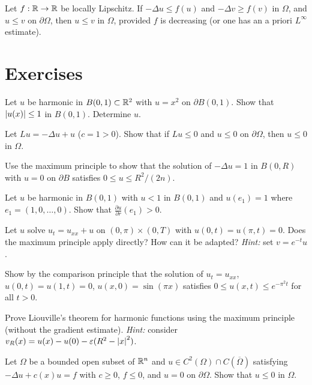 \begin{theorem}[Comparison principle for $-\Delta u = f(u)$]
Let $f : \mathbb{R} \to \mathbb{R}$ be locally Lipschitz. If $-\Delta u \leq f(u)$ and
$-\Delta v \geq f(v)$ in $\Omega$, and $u \leq v$ on $\partial\Omega$,
then $u \leq v$ in $\Omega$, provided $f$ is decreasing (or one has an
a priori $L^\infty$ estimate).
\end{theorem}

\section{Exercises}

\begin{exercise}
Let $u$ be harmonic in $B(0,1) \subset \mathbb{R}^2$ with $u = x^2$ on
$\partial B(0,1)$. Show that $\left| u(x) \right| \leq 1$ in $B(0,1)$.
Determine $u$.
\end{exercise}

\begin{exercise}
Let $Lu = -\Delta u + u$ ($c = 1 > 0$). Show that if $Lu \leq 0$ and
$u \leq 0$ on $\partial\Omega$, then $u \leq 0$ in $\Omega$.
\end{exercise}

\begin{exercise}
Use the maximum principle to show that the solution of
$-\Delta u = 1$ in $B(0,R)$ with $u = 0$ on $\partial B$ satisfies
$0 \leq u \leq R^2/(2n)$.
\end{exercise}

\begin{exercise}
Let $u$ be harmonic in $B(0,1)$ with $u < 1$ in $B(0,1)$ and
$u(e_1) = 1$ where $e_1 = (1,0,\ldots,0)$. Show that
$\frac{\partial u}{\partial r}(e_1) > 0$.
\end{exercise}

\begin{exercise}
Let $u$ solve $u_t = u_{xx} + u$ on $(0,\pi) \times (0,T)$ with
$u(0,t) = u(\pi,t) = 0$. Does the maximum principle apply directly?
How can it be adapted?
\emph{Hint:} set $v = e^{-t} u$.
\end{exercise}

\begin{exercise}
Show by the comparison principle that the solution of
$u_t = u_{xx}$, $u(0,t)=u(1,t)=0$, $u(x,0) = \sin(\pi x)$
satisfies $0 \leq u(x,t) \leq e^{-\pi^2 t}$ for all $t > 0$.
\end{exercise}

\begin{exercise}
Prove Liouville's theorem for harmonic functions using the maximum
principle (without the gradient estimate).
\emph{Hint:} consider $v_R(x) = u(x) - u(0) - \varepsilon(R^2 - \left| x \right|^2)$.
\end{exercise}

\begin{exercise}
Let $\Omega$ be a bounded open subset of $\mathbb{R}^n$ and
$u \in C^2(\Omega) \cap C(\overline{\Omega})$ satisfying
$-\Delta u + c(x) u = f$ with $c \geq 0$, $f \leq 0$, and $u = 0$
on $\partial\Omega$. Show that $u \leq 0$ in $\Omega$.
\end{exercise}
